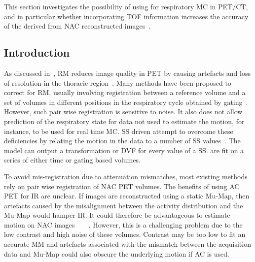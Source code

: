     
        This section investigates the possibility of using  for respiratory \gls{MC} in \gls{PET}/\gls{CT}, and in particular whether incorporating \gls{TOF} information increases the accuracy of the  derived from \gls{NAC} reconstructed images~\parencite{Whitehead2019ImpactPET}.
        
        \subsection{Introduction} \label{sec:impact_of_tof_on_respiratory_motion_model_estimation_using_pre_gated_no_intra_cycle_motion_nac_pet_introduction}
        As discussed in~, \gls{RM} reduces image quality in \gls{PET} by causing artefacts and loss of resolution in the thoracic region~\parencite{Nehmeh2008a}. Many methods have been proposed to correct for \gls{RM}, usually involving registration between a reference volume and a set of volumes in different positions in the respiratory cycle obtained by gating~\parencite{Oliveira2014}. However, such pair wise registration is sensitive to noise. It also does not allow prediction of the respiratory state for data not used to estimate the motion, for instance, to be used for real time \gls{MC}. \gls{SS} driven  attempt to overcome these deficiencies by relating the motion in the data to a number of \gls{SS} values~\parencite{McClelland2013}. The model can output a transformation or \gls{DVF} for every value of a \gls{SS}.  are fit on a series of either time or gating based volumes.

        To avoid mis-registration due to attenuation mismatches, most existing methods rely on pair wise registration of \gls{NAC} \gls{PET} volumes. The benefits of using \gls{AC} \gls{PET} for \gls{IR} are unclear. If images are reconstructed using a static \gls{Mu-Map}, then artefacts caused by the misalignment between the activity distribution and the \gls{Mu-Map} would hamper \gls{IR}. It could therefore be advantageous to estimate motion on \gls{NAC} images~\parencite{LungMotionDiaphragmBaiBib}~\parencite{Kalantari2017AttenuationRegistration:}~\parencite{Dawood2008RespiratoryAlgorithms}~\parencite{Dawood2006LungImages}. However, this is a challenging problem due to the low contrast and high noise of these volumes. Contrast may be too low to fit an accurate \gls{MM} and artefacts associated with the mismatch between the acquisition data and \gls{Mu-Map} could also obscure the underlying motion if \gls{AC} is used.
        
